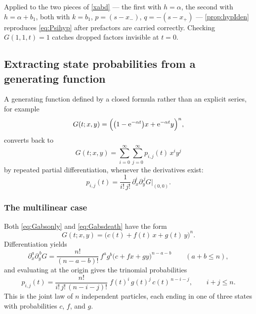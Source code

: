 \begin{remark}
Applied to the two pieces of \cref{xabd} --- the first with \(h=\alpha\), the second with \(h=\alpha+b_1\), both with \(k=b_1\), \(p=(s-x_-)\), \(q=-(s-x_+)\) --- \cref{prop:hypIden} reproduces \cref{eq:Psihyp} after prefactors are carried correctly. Checking \(G(1,1,t)=1\) catches dropped factors invisible at \(t=0\).
\end{remark}

\subsection{Extracting state probabilities from a generating function}
\label{app:extract}

A generating function defined by a closed formula rather than an explicit series, for example
\begin{equation}
\label{examplePgf}
G(t;x,y) = \Bigl(\bigl(1-{\rm e}^{-\alpha t}\bigr)x + {\rm e}^{-\alpha t}y\Bigr)^n ,
\end{equation}
converts back to
\begin{equation}
\label{series1}
G(t;x,y) = \sum^{\infty}_{i=0}\sum^{\infty}_{j=0} p_{i,j}(t)\,x^iy^j
\end{equation}
by repeated partial differentiation, whenever the derivatives exist:
\begin{equation}
\label{stateProb}
p_{i,j}(t) = \frac{1}{i!\,j!}\,\partial_x^i\partial_y^{\,j}G\Big|_{(0,0)} .
\end{equation}

\subsubsection*{The multilinear case}

Both \cref{eq:Gabsonly} and \cref{eq:Gabsdeath} have the form
\begin{equation}
\label{eq:multilinear}
G(t;x,y) = \bigl(c(t) + f(t)\,x + g(t)\,y\bigr)^n .
\end{equation}
Differentiation yields
\begin{equation}
\label{eq:derivs}
\partial_x^{a}\partial_y^{\,b}G = \frac{n!}{(n-a-b)!}\,f^{a}g^{b}\bigl(c+fx+gy\bigr)^{n-a-b}
\qquad (a+b\le n),
\end{equation}
and evaluating at the origin gives the trinomial probabilities
\begin{equation}
\label{stateProbSpec}
p_{i,j}(t) = \frac{n!}{i!\,j!\,(n-i-j)!}\;f(t)^{i}\,g(t)^{j}\,c(t)^{\,n-i-j},
\qquad i+j\le n.
\end{equation}
This is the joint law of \(n\) independent particles, each ending in one of three states with probabilities \(c\), \(f\), and \(g\).

